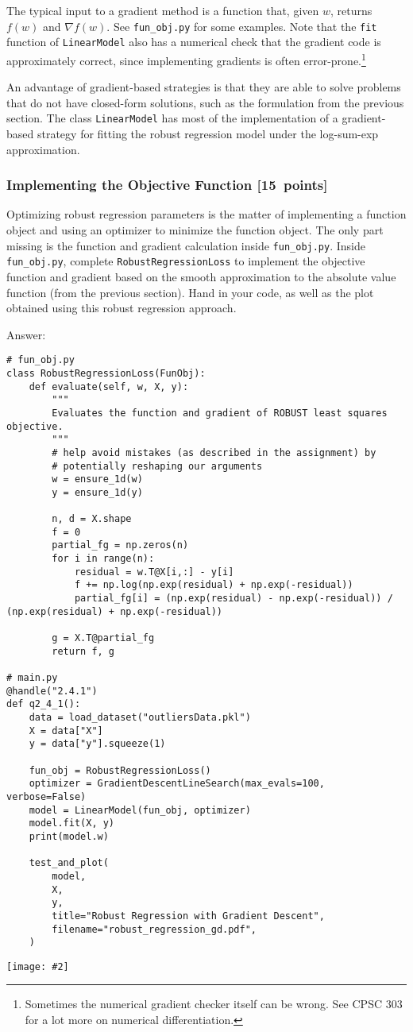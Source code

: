 \documentclass{article}
\newcommand{\blu}[1]{{\textcolor{blu}{#1}}}
\newcommand{\gre}[1]{\textcolor{gre}{#1}}
\newcommand\ans[1]{\par\gre{Answer: #1}}
\let\ask\blu
\newcommand\pts[1]{\textcolor{pointscolour}{[#1~points]}}
\newcommand{\centerfig}[2]{\begin{center}\texttt{[image: \#2]}\end{center}}
\begin{document}
The typical input to a gradient method is a function that, given $w$, returns $f(w)$ and $\nabla f(w)$. See \texttt{fun\_obj.py} for some examples. Note that the \texttt{fit} function of \texttt{LinearModel} also has a numerical check that the gradient code is approximately correct, since implementing gradients is often error-prone.\footnote{Sometimes the numerical gradient checker itself can be wrong. See CPSC 303 for a lot more on numerical differentiation.}

An advantage of gradient-based strategies is that they are able to solve
problems that do not have closed-form solutions, such as the formulation from the
previous section. The class \texttt{LinearModel} has most of the implementation
of a gradient-based strategy for fitting the robust regression model under the log-sum-exp approximation.
\newpage
\subsubsection{Implementing the Objective Function \pts{15}}

Optimizing robust regression parameters is the matter of implementing a function object and using an optimizer to minimize the function object. The only part missing is the function and gradient calculation inside \texttt{fun\_obj.py}.
\ask{Inside \texttt{fun\_obj.py}, complete \texttt{RobustRegressionLoss} to implement the objective function and gradient based on the smooth
approximation to the absolute value function (from the previous section). Hand in your code, as well
as the plot obtained using this robust regression approach.}
\ans{}
\begin{verbatim}
# fun_obj.py
class RobustRegressionLoss(FunObj):
    def evaluate(self, w, X, y):
        """
        Evaluates the function and gradient of ROBUST least squares objective.
        """
        # help avoid mistakes (as described in the assignment) by
        # potentially reshaping our arguments
        w = ensure_1d(w)
        y = ensure_1d(y)

        n, d = X.shape
        f = 0
        partial_fg = np.zeros(n)
        for i in range(n):
            residual = w.T@X[i,:] - y[i]
            f += np.log(np.exp(residual) + np.exp(-residual))
            partial_fg[i] = (np.exp(residual) - np.exp(-residual)) / (np.exp(residual) + np.exp(-residual))
            
        g = X.T@partial_fg
        return f, g

# main.py
@handle("2.4.1")
def q2_4_1():
    data = load_dataset("outliersData.pkl")
    X = data["X"]
    y = data["y"].squeeze(1)

    fun_obj = RobustRegressionLoss()
    optimizer = GradientDescentLineSearch(max_evals=100, verbose=False)
    model = LinearModel(fun_obj, optimizer)
    model.fit(X, y)
    print(model.w)

    test_and_plot(
        model,
        X,
        y,
        title="Robust Regression with Gradient Descent",
        filename="robust_regression_gd.pdf",
    )
\end{verbatim}
\centerfig{.7}{./figs/robust_regression_gd.pdf}
\newpage
\end{document}
